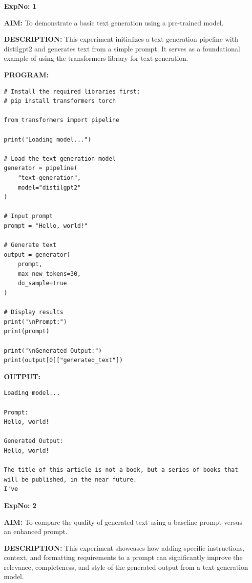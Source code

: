 \documentclass[10pt,a4paper]{article}
\newcommand{\code}[1]{{\ttfamily\hyphenchar\font=-1 #1}}
\newcommand{\sectionlabel}[1]{\par\vspace{3pt}\noindent\textbf{#1}\par\nopagebreak}
\begin{document}
\noindent\textbf{ExpNo: 1}

\noindent\textbf{AIM:} To demonstrate a basic text generation using a pre-trained model.

\noindent\textbf{DESCRIPTION:} This experiment initializes a text generation pipeline with \code{distilgpt2} and generates text from a simple prompt. It serves as a foundational example of using the \code{transformers} library for text generation.

\sectionlabel{PROGRAM:}
\begin{lstlisting}[style=code]
# Install the required libraries first:
# pip install transformers torch

from transformers import pipeline

print("Loading model...")

# Load the text generation model
generator = pipeline(
    "text-generation",
    model="distilgpt2"
)

# Input prompt
prompt = "Hello, world!"

# Generate text
output = generator(
    prompt,
    max_new_tokens=30,
    do_sample=True
)

# Display results
print("\nPrompt:")
print(prompt)

print("\nGenerated Output:")
print(output[0]["generated_text"])
\end{lstlisting}

\sectionlabel{OUTPUT:}
\begin{lstlisting}[style=output]
Loading model...

Prompt:
Hello, world!

Generated Output:
Hello, world!

The title of this article is not a book, but a series of books that will be published, in the near future.
I've
\end{lstlisting}


\clearpage

\noindent\textbf{ExpNo: 2}

\noindent\textbf{AIM:} To compare the quality of generated text using a baseline prompt versus an enhanced prompt.

\noindent\textbf{DESCRIPTION:} This experiment showcases how adding specific instructions, context, and formatting requirements to a prompt can significantly improve the relevance, completeness, and style of the generated output from a text generation model.
\end{document}
